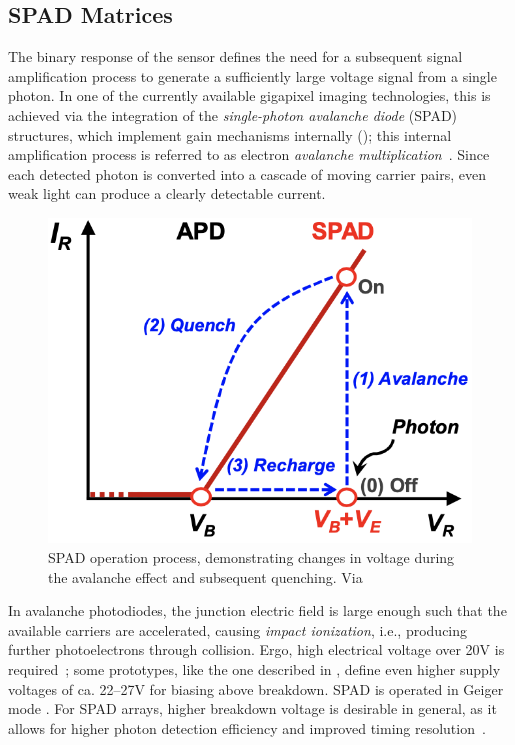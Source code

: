 \subsection{SPAD Matrices}

The binary response of the sensor defines the need for a subsequent signal amplification process to generate a sufficiently large voltage signal from a single photon. In one of the currently available gigapixel imaging technologies, this is achieved via the integration of the \textit{single-photon avalanche diode} (SPAD) structures, which implement gain mechanisms internally (\cite{Saleh1991}); this internal amplification process is referred to as electron \textit{avalanche multiplication}~\cite{Ma:17}. Since each detected photon is converted into a cascade of moving carrier pairs, even weak light can produce a clearly detectable current. %

\begin{figure}[h]
  \centering
  \includegraphics[width=0.8\linewidth]{imgs/spad/avalanche.png}
  \caption{SPAD operation process, demonstrating changes in voltage during the avalanche effect and subsequent quenching. Via \cite{Charbon2018}}
  \label{fig:avalanche}
\end{figure}

In avalanche photodiodes, the junction electric field is large enough such that the available carriers are accelerated, causing \textit{impact ionization}, i.e., producing further photoelectrons through collision. Ergo, high electrical voltage over 20V is required~\cite{Gnanasambandam_2019}; some prototypes, like the one described in \cite{rng16}, define even higher supply voltages of ca. 22–27V for biasing above breakdown. SPAD is operated in Geiger mode \cite{7117471}. For SPAD arrays, higher breakdown voltage is desirable in general, as it allows for higher photon detection efficiency and improved timing resolution~\cite{7117471}.

